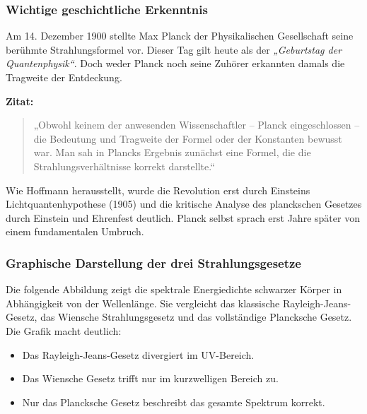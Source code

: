 \subsubsection{Wichtige geschichtliche Erkenntnis}
\medskip
\begin{tcolorbox}[didaktikbox,title=Wichtige geschichtliche Erkenntnis {\cite{Hoffmann2008}}]
	\label{box:geschichte-planck}
	Am 14. Dezember 1900 stellte Max Planck der Physikalischen Gesellschaft seine berühmte Strahlungsformel vor. Dieser Tag gilt heute als der \textit{„Geburtstag der Quantenphysik“}. Doch weder Planck noch seine Zuhörer erkannten damals die Tragweite der Entdeckung.
	
	\medskip
	
	\textbf{Zitat:} 
	\begin{quote}
		„Obwohl keinem der anwesenden Wissenschaftler – Planck eingeschlossen – die Bedeutung und Tragweite der Formel oder der Konstanten bewusst war. Man sah in Plancks Ergebnis zunächst eine Formel, die die Strahlungsverhältnisse korrekt darstellte.“
	\end{quote}
	
	Wie Hoffmann herausstellt, wurde die Revolution erst durch Einsteins Lichtquantenhypothese (1905) und die kritische Analyse des planckschen Gesetzes durch Einstein und Ehrenfest deutlich. Planck selbst sprach erst Jahre später von einem fundamentalen Umbruch.
\end{tcolorbox}

\subsubsection{Graphische Darstellung der drei Strahlungsgesetze}

Die folgende Abbildung zeigt die spektrale Energiedichte schwarzer Körper in Abhängigkeit von der Wellenlänge. Sie vergleicht das klassische Rayleigh-Jeans-Gesetz, das Wiensche Strahlungsgesetz und das vollständige Plancksche Gesetz. Die Grafik macht deutlich:

\begin{itemize}
	\item Das Rayleigh-Jeans-Gesetz divergiert im UV-Bereich.
	\item Das Wiensche Gesetz trifft nur im kurzwelligen Bereich zu.
	\item Nur das Plancksche Gesetz beschreibt das gesamte Spektrum korrekt.
\end{itemize}

